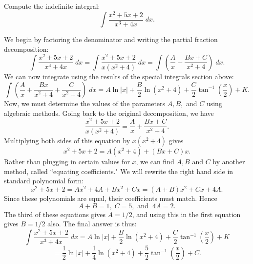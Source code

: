 \documentclass[handout]{ximera}
\begin{document}
\begin{example}[example 7]

Compute the indefinite integral:
\[
\int \frac{x^2 + 5x + 2}{x^3 + 4x} \; dx.
\]

We begin by factoring the denominator and writing the partial fraction decomposition:
\[
\int \frac{x^2 + 5x + 2}{x^3 + 4x} \; dx = \int \frac{x^2 + 5x + 2}{x(x^2 + 4)} \; dx = \int \left(\frac{A}{x} + \frac{Bx+C}{x^2+4} \right) \; dx.
\]
We can now integrate using the results of the special integrals section above:
\[
\int \left(\frac{A}{x} + \frac{Bx}{x^2+4} + \frac{C}{x^2+4} \right) \; dx = A\ln|x| + \frac{B}{2}\ln(x^2 +4 ) + \frac{C}{2}\tan^{-1}\left(\frac{x}{2}\right) + K.
\]
Now, we must determine the values of the parameters $A, B, $ and $C$ using algebraic methods.
Going back to the original decomposition, we have
\[
\frac{x^2 + 5x + 2}{x(x^2 + 4)} = \frac{A}{x} + \frac{Bx+C}{x^2+4}.
\]
Multiplying both sides of this equation by $x(x^2 +4)$ gives
\[
x^2 + 5x + 2 = A(x^2 +4)+ (Bx + C)x.
\]
Rather than plugging in certain values for $x$, we can find $A, B$ and $C$ by another method, called ``equating coefficients."
We will rewrite the right hand side in standard polynomial form:
\[
x^2 + 5x + 2 = Ax^2 + 4A + Bx^2 + Cx = (A+B)x^2 + Cx + 4A.
\]
Since these polynomials are equal, their coefficients must match.  Hence
\[
A+B = 1,\; C = 5, \text { and } \; 4A = 2.
\]
The third of these equations gives $A = 1/2$, and using this in the first equation gives $B = 1/2$ also.
The final answer is thus:
\[
\int \frac{x^2 + 5x + 2}{x^3 + 4x} \; dx = A\ln|x| + \frac{B}{2}\ln(x^2 +4 ) + \frac{C}{2}\tan^{-1}\left(\frac{x}{2}\right) + K
\]
\[
= \frac12\ln|x| + \frac{1}{4}\ln(x^2 +4 ) + \frac{5}{2}\tan^{-1}\left(\frac{x}{2}\right) + C.
\]

\end{example}



\begin{center}
\begin{foldable}
\end{foldable}
\end{center}
\end{document}
